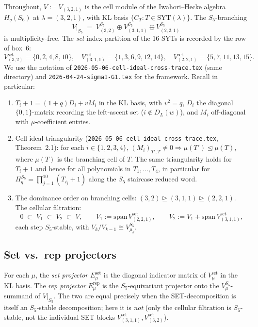 \documentclass[11pt]{article}
\theoremstyle{definition}
\begin{document}
Throughout, $V := V_{(3,2,1)}$ is the cell module of the Iwahori--Hecke algebra $H_q(S_6)$ at $\lambda = (3,2,1)$, with KL basis $\{C_T : T \in \mathrm{SYT}(\lambda)\}$. The $S_5$-branching
\[
V\big|_{S_5} \;=\; V_{(3,2)}^{S_5} \oplus V_{(3,1,1)}^{S_5} \oplus V_{(2,2,1)}^{S_5}
\]
is multiplicity-free. The \emph{set} index partition of the 16 SYTs is recorded by the row of box~6:
\[
V_{(3,2)}^{\mathrm{set}} = \{0,2,4,8,10\}, \quad V_{(3,1,1)}^{\mathrm{set}} = \{1,3,6,9,12,14\}, \quad V_{(2,2,1)}^{\mathrm{set}} = \{5,7,11,13,15\}.
\]
We use the notation of \texttt{2026-05-06-cell-ideal-cross-trace.tex} (same directory) and \texttt{2026-04-24-sigma1-G1.tex} for the framework. Recall in particular:

\begin{enumerate}[leftmargin=2em,topsep=0.2em,itemsep=0.2em]
\item $T_i + 1 = (1+q)D_i + vM_i$ in the KL basis, with $v^2 = q$, $D_i$ the diagonal $\{0,1\}$-matrix recording the left-ascent set ($i \notin D_L(w)$), and $M_i$ off-diagonal with $\mu$-coefficient entries.

\item Cell-ideal triangularity (\texttt{2026-05-06-cell-ideal-cross-trace.tex}, Theorem~2.1): for each $i \in \{1,2,3,4\}$, $(M_i)_{T',T} \neq 0 \Rightarrow \mu(T') \trianglelefteq \mu(T)$, where $\mu(T)$ is the branching cell of $T$. The same triangularity holds for $T_i + 1$ and hence for all polynomials in $T_1,\ldots,T_4$, in particular for $\Pi_q^{S_5} = \prod_{j=1}^{10}(T_{i_j}+1)$ along the $S_5$ staircase reduced word.

\item The dominance order on branching cells: $(3,2) \trianglerighteq (3,1,1) \trianglerighteq (2,2,1)$. The cellular filtration:
\[
0 \;\subset\; V_1 \;\subset\; V_2 \;\subset\; V, \qquad V_1 := \mathrm{span}\,V_{(2,2,1)}^{\mathrm{set}}, \qquad V_2 := V_1 + \mathrm{span}\,V_{(3,1,1)}^{\mathrm{set}},
\]
each step $S_5$-stable, with $V_k / V_{k-1} \cong V_{\mu_k}^{S_5}$.
\end{enumerate}

\subsection*{Set vs.\ rep projectors}

For each $\mu$, the \emph{set projector} $E_\mu^{\mathrm{set}}$ is the diagonal indicator matrix of $V_\mu^{\mathrm{set}}$ in the KL basis. The \emph{rep projector} $E_\mu^{\mathrm{rep}}$ is the $S_5$-equivariant projector onto the $V_\mu^{S_5}$-summand of $V|_{S_5}$. The two are equal precisely when the SET-decomposition is itself an $S_5$-stable decomposition; here it is \emph{not} (only the cellular filtration is $S_5$-stable, not the individual SET-blocks $V_{(3,1,1)}^{\mathrm{set}}, V_{(3,2)}^{\mathrm{set}}$).
\end{document}
